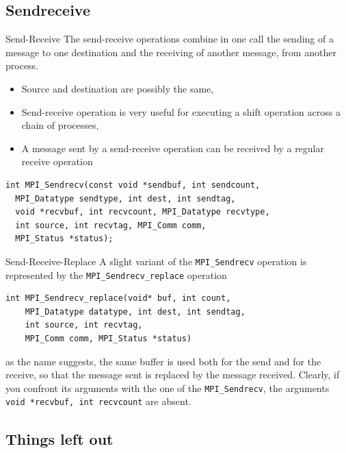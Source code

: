 \documentclass[xcolor={svgnames,usenames}]{beamer}
\begin{document}
\subsection{Sendreceive}

\begin{frame}[fragile]{Send-Receive}
The \alert{send-receive} operations combine in one call the sending of a message to one destination and the receiving of another message, from another process.
\begin{itemize}
	\item Source and destination are possibly the same,
	\item Send-receive operation is very useful for executing a shift operation across a chain of processes,
	\item A message sent by a send-receive operation can be received by a regular receive operation
\end{itemize}
\begin{verbatim}
int MPI_Sendrecv(const void *sendbuf, int sendcount, 
  MPI_Datatype sendtype, int dest, int sendtag, 
  void *recvbuf, int recvcount, MPI_Datatype recvtype, 
  int source, int recvtag, MPI_Comm comm,
  MPI_Status *status);
\end{verbatim}
\end{frame}

\begin{frame}[fragile]{Send-Receive-Replace}
A slight variant of the \texttt{MPI_Sendrecv} operation is represented by the \texttt{MPI_Sendrecv_replace} operation
\begin{verbatim}
int MPI_Sendrecv_replace(void* buf, int count, 
	MPI_Datatype datatype, int dest, int sendtag, 
	int source, int recvtag, 
	MPI_Comm comm, MPI_Status *status)
\end{verbatim}
as the name suggests, the same buffer is used both for the send and
for the receive, so that the message sent is replaced by the message received.
\vfill
Clearly, if you confront its arguments with the one of the \texttt{MPI_Sendrecv}, the arguments \texttt{void *recvbuf, int recvcount} are absent.
\end{frame}

\subsection{Things left out}
\end{document}
